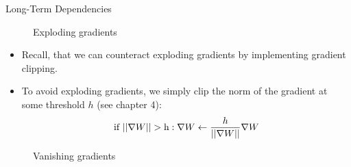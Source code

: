 \begin{vbframe}{Long-Term Dependencies}
  \framebreak
  \begin{figure}
      \centering
      \caption{\footnotesize {Exploding gradients}}
  \end{figure}

  \begin{itemize}
    \item Recall, that we can counteract exploding gradients by implementing gradient clipping.
    \item To avoid exploding gradients, we simply clip the norm of the gradient at some threshold $h$ (see chapter 4): $$\text{if  } ||\nabla W|| > \text h: \nabla W \leftarrow \frac{h}{||\nabla W||} \nabla W $$
  \end{itemize}

\framebreak

  \begin{figure}
      \centering
      \caption{\footnotesize {Vanishing gradients}}
  \end{figure}



\end{vbframe}
